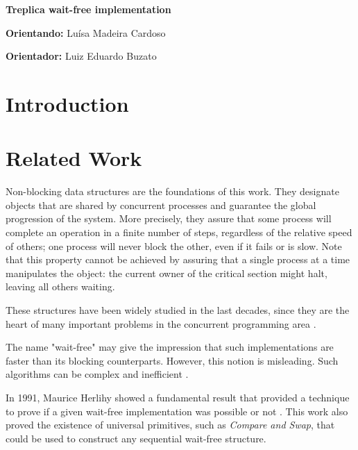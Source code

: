 \documentclass[12pt,twoside,a4paper]{article}
\begin{document}
\vskip 15mm

\begin{center} 
\textbf{Treplica wait-free implementation}
\end{center}

\vskip 5mm

\textbf{Orientando:} Luísa Madeira Cardoso

\textbf{Orientador:} Luiz Eduardo Buzato 

\vskip 20mm

\begin{abstract}

\end{abstract}

\newpage
\pagestyle{plain}
\headheight 0.0cm
\headsep 0.0cm
\footskip 2.2cm

\section{Introduction}


\section{Related Work}
\label{sec:related}

Non-blocking data structures are the foundations of this work. They designate objects that are shared by concurrent processes and guarantee the global progression of the system. More precisely, they  assure that some process will complete an operation in a finite number of steps, regardless of the relative speed of others; one process will never block the other, even if it fails or is slow. Note that this  property cannot be achieved by assuring that a single process at a time manipulates the object: the current owner of the critical section might halt, leaving all others waiting. 

These structures have been widely studied in the last decades, since they are the heart of many important problems in the concurrent	 programming area \cite{herlihy2011art}.



The name "wait-free" may give the impression that such implementations are faster than its blocking counterparts. However, this notion is misleading.  Such algorithms can be complex and inefficient \cite{attiya1994wait}.  

In 1991, Maurice Herlihy showed a fundamental result that provided a technique to prove if a given wait-free implementation was possible or not \cite{herlihy1991wait}. This work also proved the existence of universal primitives, such as \textit{Compare and Swap}, that could be used to construct any sequential wait-free structure. 
\end{document}
